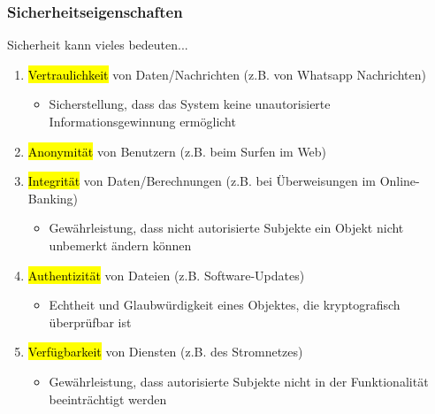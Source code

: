 \documentclass[a4paper, 10pt]{article}
\begin{document}
\subsubsection{Sicherheitseigenschaften}
Sicherheit kann vieles bedeuten...
\begin{enumerate}
    \item \hl{Vertraulichkeit} von Daten/Nachrichten (z.B. von Whatsapp Nachrichten)
    \begin{itemize}
        \item Sicherstellung, dass das System keine unautorisierte Informationsgewinnung ermöglicht
    \end{itemize}
    \item \hl{Anonymität} von Benutzern (z.B. beim Surfen im Web)
    \item \hl{Integrität} von Daten/Berechnungen (z.B. bei Überweisungen im Online-Banking)
    \begin{itemize}
        \item Gewährleistung, dass nicht autorisierte Subjekte ein Objekt nicht unbemerkt ändern können
    \end{itemize}
    \item \hl{Authentizität} von Dateien (z.B. Software-Updates)
    \begin{itemize}
        \item Echtheit und Glaubwürdigkeit eines Objektes, die kryptografisch überprüfbar ist 
    \end{itemize}
    \item \hl{Verfügbarkeit} von Diensten (z.B. des Stromnetzes)
    \begin{itemize}
        \item Gewährleistung, dass autorisierte Subjekte nicht in der Funktionalität beeinträchtigt werden
    \end{itemize}
\end{enumerate}
\end{document}
